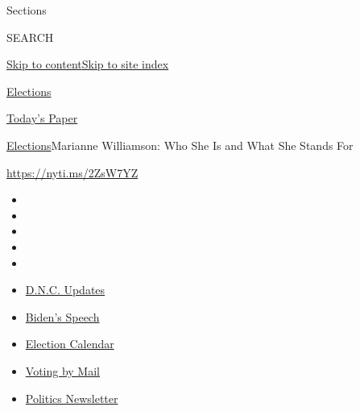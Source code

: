 Sections

SEARCH

\protect\hyperlink{site-content}{Skip to
content}\protect\hyperlink{site-index}{Skip to site index}

\href{https://www.nytimes3xbfgragh.onion/news-event/2020-election}{Elections}

\href{https://myaccount.nytimes3xbfgragh.onion/auth/login?response_type=cookie\&client_id=vi}{}

\href{https://www.nytimes3xbfgragh.onion/section/todayspaper}{Today's
Paper}

\href{/news-event/2020-election}{Elections}\textbar{}Marianne
Williamson: Who She Is and What She Stands For

\url{https://nyti.ms/2ZsW7YZ}

\begin{itemize}
\item
\item
\item
\item
\item
\end{itemize}

\begin{itemize}
\item
  \href{https://www.nytimes3xbfgragh.onion/live/2020/08/21/us/dnc-convention-election?action=click\&pgtype=Article\&state=default\&region=TOP_BANNER\&context=storylines_menu}{D.N.C.
  Updates}
\item
  \href{https://www.nytimes3xbfgragh.onion/2020/08/20/us/politics/biden-presidential-nomination-dnc.html?action=click\&pgtype=Article\&state=default\&region=TOP_BANNER\&context=storylines_menu}{Biden's
  Speech}
\item
  \href{https://www.nytimes3xbfgragh.onion/interactive/2019/us/elections/2020-presidential-election-calendar.html?action=click\&pgtype=Article\&state=default\&region=TOP_BANNER\&context=storylines_menu}{Election
  Calendar}
\item
  \href{https://www.nytimes3xbfgragh.onion/interactive/2020/08/11/us/politics/vote-by-mail-us-states.html?action=click\&pgtype=Article\&state=default\&region=TOP_BANNER\&context=storylines_menu}{Voting
  by Mail}
\item
  \href{https://www.nytimes3xbfgragh.onion/newsletters/politics?action=click\&pgtype=Article\&state=default\&region=TOP_BANNER\&context=storylines_menu}{Politics
  Newsletter}
\end{itemize}

